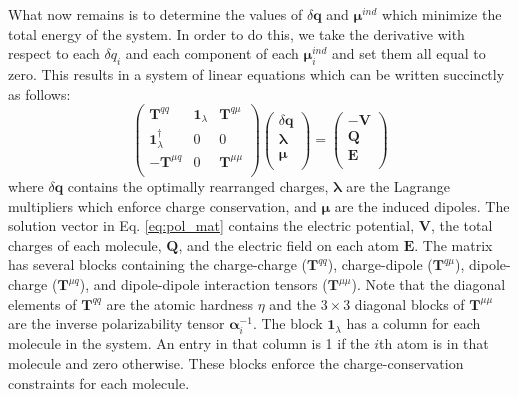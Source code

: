 \documentclass[journal=jctcce,manuscript=article]{achemso}
\begin{document}
What now remains is to determine the values of $\delta \bm{q}$ and $\bm{\mu}^{ind}$ which minimize the total energy of the system. In order to do this, we take the derivative with respect to each $\delta q_i$ and each component of each $\bm{\mu}_i^{ind}$ and set them all equal to zero. This results in a system of linear equations which can be written succinctly as follows:
\begin{equation}
  \begin{pmatrix}
    \bm{T}^{qq} & \bm{1}_\lambda & \bm{T}^{q\mu} \\
    \bm{1}_\lambda^\dagger & 0 & 0 \\
    -\bm{T}^{\mu q} & 0 & \bm{T}^{\mu\mu} \\
  \end{pmatrix}
  \begin{pmatrix}
    \delta \bm{q} \\
    \bm{\lambda} \\
    \bm{\mu} \\
  \end{pmatrix}
  =
  \begin{pmatrix}
    -\bm{V} \\
    \bm{Q} \\
    \bm{E} \\
  \end{pmatrix}
  \label{eq:pol_mat}
\end{equation}
where $\delta\bm{q}$ contains the optimally rearranged charges, $\bm{\lambda}$ are the Lagrange multipliers which enforce charge conservation, and $\bm{\mu}$ are the induced dipoles. The solution vector in Eq. \ref{eq:pol_mat} contains the electric potential, $\bm{V}$, the total charges of each molecule, $\bm{Q}$, and the electric field on each atom $\bm{E}$. The matrix has several blocks containing the charge-charge ($\bm{T}^{qq}$), charge-dipole ($\bm{T}^{q\mu}$), dipole-charge ($\bm{T}^{\mu q}$), and dipole-dipole interaction tensors ($\bm{T}^{\mu\mu}$). Note that the diagonal elements of $\bm{T}^{qq}$ are the atomic hardness $\eta$ and the $3\times 3$ diagonal blocks of $\bm{T}^{\mu\mu}$ are the inverse polarizability tensor $\bm{\alpha}_i^{-1}$. The block $\bm{1}_\lambda$ has a column for each molecule in the system. An entry in that column is 1 if the $i$th atom is in that molecule and zero otherwise. These blocks enforce the charge-conservation constraints for each molecule.
\end{document}
